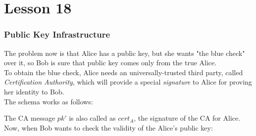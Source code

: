 \chapter*{Lesson 18}

\subsection{Public Key Infrastructure}

The problem now is that Alice has a public key, but she wants "the blue check"
over it, so Bob is sure that public key comes only from the true Alice.\\

To obtain the blue check, Alice needs an universally-trusted third party, called
\textit{ Certification Authority}, which will provide a special
\textit{signature} to Alice for proving her identity to Bob.\\
The schema works as follows:

\begin{figure}[h!]
   \centering
   \sdinit{}
\end{figure}

The CA message $pk'$ is also called as $cert_{A}$, the signature of the CA for
Alice.\\

Now, when Bob wants to check the validity of the Alice's public key:

